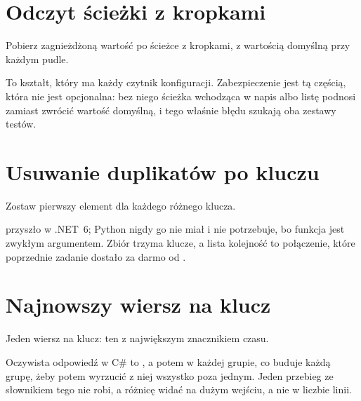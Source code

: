 \section{Odczyt ścieżki z kropkami}
\label{sec:appD-deep-get}

\noindent
Pobierz zagnieżdżoną wartość po ścieżce z kropkami, z wartością domyślną przy każdym pudle.



\noindent
To kształt, który ma każdy czytnik konfiguracji. Zabezpieczenie  jest tą częścią, która nie jest opcjonalna: bez niego ścieżka wchodząca w napis albo listę podnosi  zamiast zwrócić wartość domyślną, i tego właśnie błędu szukają oba zestawy testów.

\section{Usuwanie duplikatów po kluczu}
\label{sec:appD-dedupe-by}

\noindent
Zostaw pierwszy element dla każdego różnego klucza.



\noindent
{} przyszło w .NET~6; Python nigdy go nie miał i nie potrzebuje, bo funkcja jest zwykłym argumentem. Zbiór trzyma klucze, a lista kolejność \dash{} to połączenie, które poprzednie zadanie dostało za darmo od .

\section{Najnowszy wiersz na klucz}
\label{sec:appD-latest}

\noindent
Jeden wiersz na klucz: ten z największym znacznikiem czasu.



\noindent
Oczywista odpowiedź w C\# to , a potem  w każdej grupie, co buduje każdą grupę, żeby potem wyrzucić z niej wszystko poza jednym. Jeden przebieg ze słownikiem tego nie robi, a różnicę widać na dużym wejściu, a nie w liczbie linii.

